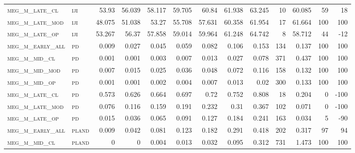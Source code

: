 \begin{landscape}
\begin{center}
\begin{footnotesize}
\begin{longtable}{llrrrrrrrr|rrr}
\textsc{meg\_m\_late\_cl  } & \textsc{iji       }   & 53.93    & 56.039   & 58.117   & 59.705   & 60.84    & 61.938   & 63.245    & 10     & 60.085        & 59            & 18              \\
\textsc{meg\_m\_late\_mod } & \textsc{iji       }   & 48.075   & 51.038   & 53.27    & 55.708   & 57.631   & 60.358   & 61.954    & 17     & 61.664        & 100           & 100             \\
\textsc{meg\_m\_late\_op  } & \textsc{iji       }   & 53.267   & 56.37    & 57.858   & 59.014   & 59.964   & 61.248   & 64.742    & 8      & 58.712        & 44            & -12             \\
\textsc{meg\_m\_early\_all} & \textsc{pd        }   & 0.009    & 0.027    & 0.045    & 0.059    & 0.082    & 0.106    & 0.153     & 134    & 0.137         & 100           & 100             \\
\textsc{meg\_m\_mid\_cl   } & \textsc{pd        }   & 0.001    & 0.001    & 0.003    & 0.007    & 0.013    & 0.027    & 0.078     & 371    & 0.437         & 100           & 100             \\
\textsc{meg\_m\_mid\_mod  } & \textsc{pd        }   & 0.007    & 0.015    & 0.025    & 0.036    & 0.048    & 0.072    & 0.116     & 158    & 0.132         & 100           & 100             \\
\textsc{meg\_m\_mid\_op   } & \textsc{pd        }   & 0.001    & 0.001    & 0.002    & 0.004    & 0.007    & 0.013    & 0.02      & 300    & 0.133         & 100           & 100             \\
\textsc{meg\_m\_late\_cl  } & \textsc{pd        }   & 0.573    & 0.626    & 0.664    & 0.697    & 0.72     & 0.752    & 0.808     & 18     & 0.204         & 0             & -100            \\
\textsc{meg\_m\_late\_mod } & \textsc{pd        }   & 0.076    & 0.116    & 0.159    & 0.191    & 0.232    & 0.31     & 0.367     & 102    & 0.071         & 0             & -100            \\
\textsc{meg\_m\_late\_op  } & \textsc{pd        }   & 0.015    & 0.036    & 0.065    & 0.091    & 0.127    & 0.184    & 0.241     & 163    & 0.034         & 5             & -90             \\
\textsc{meg\_m\_early\_all} & \textsc{pland     }   & 0.009    & 0.042    & 0.081    & 0.123    & 0.182    & 0.291    & 0.418     & 202    & 0.317         & 97            & 94              \\
\textsc{meg\_m\_mid\_cl   } & \textsc{pland     }   & 0        & 0        & 0.004    & 0.013    & 0.032    & 0.095    & 0.312     & 731    & 1.473         & 100           & 100             \\

\end{longtable}
\end{footnotesize}
\end{center}
\end{landscape}

